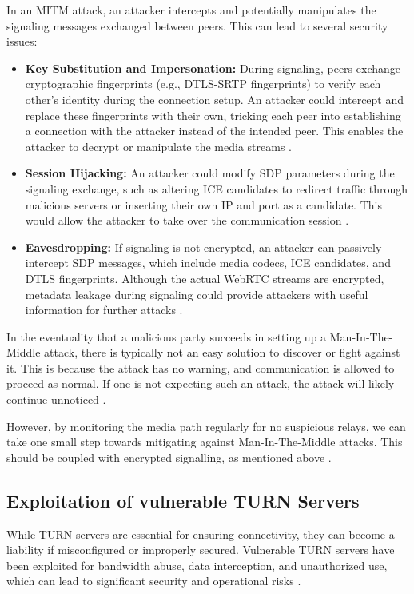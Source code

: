 \documentclass[conference]{IEEEtran}
\begin{document}
In an MITM attack, an attacker intercepts and potentially manipulates the signaling messages exchanged between peers. This can lead to several security issues:
\begin{itemize}
    \item \textbf{Key Substitution and Impersonation:} During signaling, peers exchange cryptographic fingerprints (e.g., DTLS-SRTP fingerprints) 
    to verify each other's identity during the connection setup. An attacker could intercept and replace these fingerprints with their 
    own, tricking each peer into establishing a connection with the attacker instead of the intended peer. This enables the attacker
    to decrypt or manipulate the media streams \cite{security_of_WebRTC}.
    \item \textbf{Session Hijacking:} An attacker could modify SDP parameters during the signaling exchange, such as altering ICE candidates to redirect traffic 
    through malicious servers or inserting their own IP and port as a candidate. This would allow the attacker to take over the communication session \cite{security_of_WebRTC}.
    \item \textbf{Eavesdropping:} If signaling is not encrypted, an attacker can passively intercept SDP messages, which include media codecs, ICE candidates, 
    and DTLS fingerprints. Although the actual WebRTC streams are encrypted, metadata leakage during signaling could provide attackers with 
    useful information for further attacks \cite{security_of_WebRTC}.
\end{itemize}
In the eventuality that a malicious party succeeds in setting up a Man-In-The-Middle attack, there is typically 
not an easy solution to discover or fight against it. This is because the attack has no warning, and 
communication is allowed to proceed as normal. If one is not expecting such an attack, the attack will likely 
continue unnoticed \cite{WebRTC_Security}.

However, by monitoring the media path regularly for no suspicious relays, we can take one small step 
towards mitigating against Man-In-The-Middle attacks. This should be coupled with encrypted signalling, as mentioned above \cite{WebRTC_Security}.

\subsection{Exploitation of vulnerable TURN Servers}
While TURN servers are essential for ensuring connectivity, they can become a liability if misconfigured or improperly secured. Vulnerable TURN servers 
have been exploited for bandwidth abuse, data interception, and unauthorized use, which can lead to significant security and operational risks \cite{security_of_WebRTC}.
\end{document}
